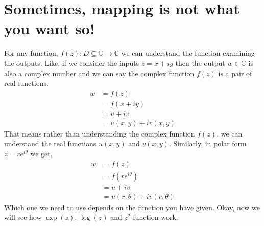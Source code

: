 \section{Sometimes, mapping is not what you want so!}
For any function, $f(z):D\subseteq\mathbb{C}\rightarrow\mathbb{C}$ we can understand the function examining the outputs. Like, if we consider the inputs $z=x+iy$ then the output $w\in\mathbb{C}$ is also a complex number and we can say the complex function $f(z)$ is a pair of real functions. 
\begin{align*}
    w&=f(z)\\
    &=f(x+iy)\\
    &=u+iv\\
    &=u(x,y)+iv(x,y)
\end{align*}
That means rather than understanding the complex function $f(z)$, we can understand the real functions $u(x,y)$ and $v(x,y)$. Similarly, in polar form $z=re^{i\theta}$ we get, 
\begin{align*}
    w&=f(z)\\
    &=f(re^{i\theta})\\
    &=u+iv\\
    &=u(r,\theta)+iv(r,\theta)
\end{align*}
Which one we need to use depends on the function you have given. Okay, now we will see how $\exp(z)$, $\log(z)$ and $z^2$ function work. 
